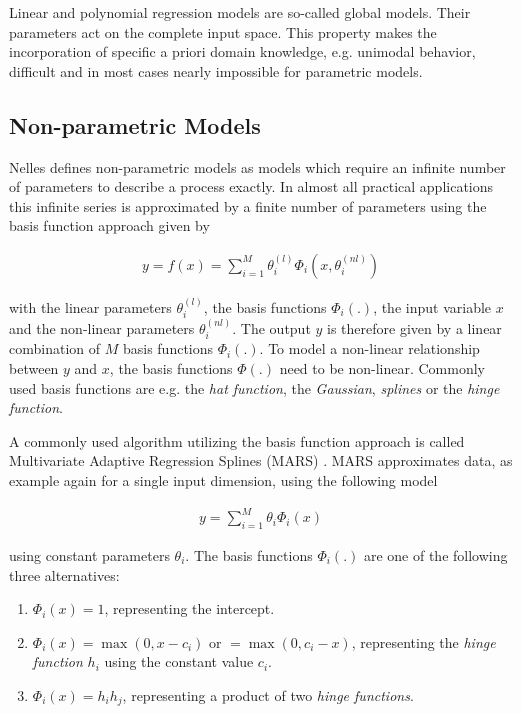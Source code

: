 Linear and polynomial regression models are so-called global models. Their parameters act on the complete input space. This property makes the incorporation of specific a priori domain knowledge, e.g. unimodal behavior, difficult and in most cases nearly impossible for parametric models. 

\subsection{Non-parametric Models}

Nelles defines non-parametric models as models which require an infinite number of parameters to describe a process exactly\cite{nelles2013nonlinear}. In almost all practical applications this infinite series is approximated by a finite number of parameters using the basis function approach given by

\begin{align} \label{eq:basis-function-approach}
	y = f(x) = \sum_{i=1}^M \theta_i^{(l)} \Phi_i(x, \theta_i^{(nl)})
\end{align} 

with the linear parameters $\theta_i^{(l)}$, the basis functions $\Phi_i(.)$, the input variable $x$ and the non-linear parameters $\theta_i^{(nl)}$. The output $y$ is therefore given by a linear combination of $M$ basis functions $\Phi_i(.)$. To model a non-linear relationship between $y$ and $x$, the basis functions $\Phi(.)$ need to be non-linear. Commonly used basis functions are e.g. the \emph{hat function}, the \emph{Gaussian}, \emph{splines} or the \emph{hinge function}. 

A commonly used algorithm utilizing the basis function approach is called Multivariate Adaptive Regression Splines (MARS) \cite{friedman1991multivariate}. MARS approximates data, as example again for a single input dimension, using the following model

\begin{align} \label{eq:MARS}
	y = \sum_{i=1}^M \theta_i \Phi_i(x)
\end{align}

using constant parameters $\theta_i$. The basis functions $\Phi_i(.)$ are one of the following three alternatives:

\begin{enumerate}
	\item $\Phi_i(x) = 1$, representing the intercept.
	\item $\Phi_i(x) = \max(0, x - c_i)$ or $= \max(0, c_i - x)$, representing the \emph{hinge function} $h_i$ using the constant value $c_i$.
	\item $\Phi_i(x) = h_i  h_j$, representing a product of two \emph{hinge functions}.
\end{enumerate}

